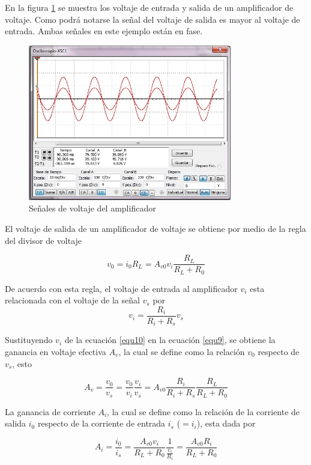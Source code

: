 \documentclass[12pt]{book}
\theoremstyle{definition}
\theoremstyle{remark}
\theoremstyle{plain}
\begin{document}
En la figura \ref{fig5} se muestra los voltaje de entrada y salida de un amplificador de voltaje. Como podrá notarse la señal del voltaje de salida es mayor al voltaje de entrada. Ambas señales en este ejemplo están en fase.
\begin{figure}
\centering
\includegraphics[width=3.5in]{senalamplificador.jpg}
\caption{Señales de voltaje del amplificador}
\label{fig5}
\end{figure}

El voltaje de salida de un amplificador de voltaje se obtiene por medio de la regla del divisor de voltaje

\begin{equation}
\label{equ9}
v_0 = i_0 R_L = A_{v0} v_i \frac{R_L}{R_L+R_0}
\end{equation}

De acuerdo con esta regla, el voltaje de entrada al amplificador $v_i$ esta relacionada con el voltaje de la señal $v_s$ por
\begin{equation}
\label{equ10}
v_i = \frac{R_i}{R_i+R_s} v_s
\end{equation}

Sustituyendo $v_i$ de la ecuación \ref{equ10} en la ecuación \ref{equ9}, se obtiene la ganancia en voltaje efectiva $A_v$, la cual se define como la relación $v_0$ respecto de $v_s$, esto

 \begin{equation}
\label{equ11}
A_v= \frac{v_0}{v_s} = \frac{v_0}{v_i} \frac{v_i}{v_s}= A_{v0} \frac{R_i}{R_i+R_s} \frac{R_L}{R_L+R_0}
\end{equation}

La ganancia de corriente $A_i$, la cual se define como la relación de la corriente de salida $i_0$ respecto de la corriente de entrada $i_s$ ($=i_i$), esta dada por

\begin{equation}
\label{equ12}
A_i= \frac{i_0}{i_s} = \frac{A_{v 0} v_i}{R_L+R_0} \frac{1}{\frac{v_i}{R_i}}=\frac{A_{v 0} R_i}{R_L+R_0}
\end{equation}
\end{document}
